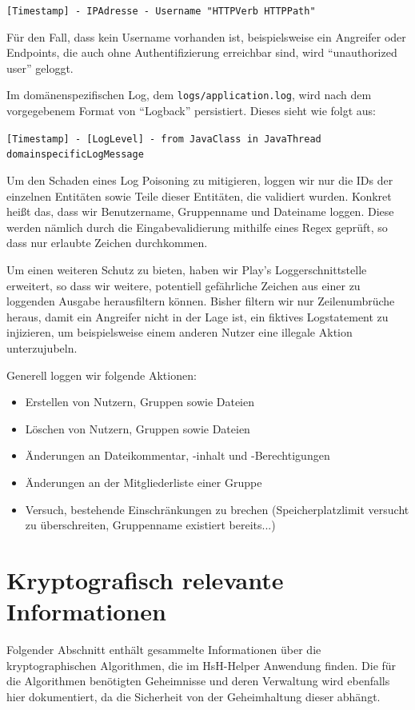 \documentclass[12pt,DIV14,BCOR10mm,a4paper,parskip=half-,headsepline,headinclude,english,ngerman,bibliography=totocnumbered]{scrreprt}
\begin{document}
\texttt{[Timestamp] - IPAdresse - Username "HTTPVerb HTTPPath"}

Für den Fall, dass kein Username vorhanden ist, beispielsweise ein Angreifer oder Endpoints, die auch ohne Authentifizierung erreichbar sind, wird \enquote{unauthorized user} geloggt.

Im domänenspezifischen Log, dem \texttt{logs/application.log}, wird nach dem vorgegebenem Format von \enquote{Logback} persistiert.
Dieses sieht wie folgt aus:

\texttt{[Timestamp] - [LogLevel] - from JavaClass in JavaThread\\
domainspecificLogMessage}

Um den Schaden eines Log Poisoning zu mitigieren, loggen wir nur die IDs der einzelnen Entitäten sowie Teile dieser Entitäten, die validiert wurden.
Konkret heißt das, dass wir Benutzername, Gruppenname und Dateiname loggen.
Diese werden nämlich durch die Eingabevalidierung mithilfe eines Regex geprüft, so dass nur erlaubte Zeichen durchkommen.

Um einen weiteren Schutz zu bieten, haben wir Play's Loggerschnittstelle erweitert, so dass wir weitere, potentiell gefährliche Zeichen aus einer zu loggenden Ausgabe herausfiltern können.
Bisher filtern wir nur Zeilenumbrüche heraus, damit ein Angreifer nicht in der Lage ist, ein fiktives Logstatement zu injizieren, um beispielsweise einem anderen Nutzer eine illegale Aktion unterzujubeln.

Generell loggen wir folgende Aktionen:
\begin{itemize}
	\item Erstellen von Nutzern, Gruppen sowie Dateien
	\item Löschen von Nutzern, Gruppen sowie Dateien
	\item Änderungen an Dateikommentar, -inhalt und -Berechtigungen
	\item Änderungen an der Mitgliederliste einer Gruppe
	\item Versuch, bestehende Einschränkungen zu brechen (Speicherplatzlimit versucht zu überschreiten, Gruppenname existiert bereits...)
\end{itemize}

\chapter{Kryptografisch relevante Informationen}
Folgender Abschnitt enthält gesammelte Informationen über die kryptographischen Algorithmen, die im HsH-Helper Anwendung finden. Die für die Algorithmen benötigten Geheimnisse und deren Verwaltung wird ebenfalls hier dokumentiert, da die Sicherheit von der Geheimhaltung dieser abhängt.
\end{document}
